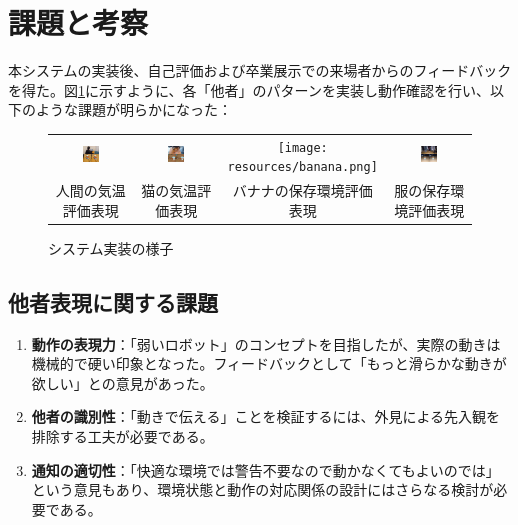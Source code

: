 \documentclass{cuxarticle}
\begin{document}
\section{課題と考察}
本システムの実装後、自己評価および卒業展示での来場者からのフィードバックを得た。図\ref{fig:system-test}に示すように、各「他者」のパターンを実装し動作確認を行い、以下のような課題が明らかになった：

\begin{figure}[h]
  \centering
  \begin{tabular}{cccc}
    \includegraphics[width=0.22\textwidth]{resources/human.png} &
    \includegraphics[width=0.22\textwidth]{resources/cat.png} &
    \texttt{[image: resources/banana.png]} &
    \includegraphics[width=0.22\textwidth]{resources/clothes.png} \\
    人間の気温評価表現 & 猫の気温評価表現 & バナナの保存環境評価表現 & 服の保存環境評価表現
  \end{tabular}
  \caption{システム実装の様子}
  \label{fig:system-test}
\end{figure}

\subsection{他者表現に関する課題}
\begin{enumerate}
  \item \textbf{動作の表現力}：「弱いロボット」のコンセプトを目指したが、実際の動きは機械的で硬い印象となった。フィードバックとして「もっと滑らかな動きが欲しい」との意見があった。

  \item \textbf{他者の識別性}：「動きで伝える」ことを検証するには、外見による先入観を排除する工夫が必要である。

  \item \textbf{通知の適切性}：「快適な環境では警告不要なので動かなくてもよいのでは」という意見もあり、環境状態と動作の対応関係の設計にはさらなる検討が必要である。
\end{enumerate}
\end{document}
